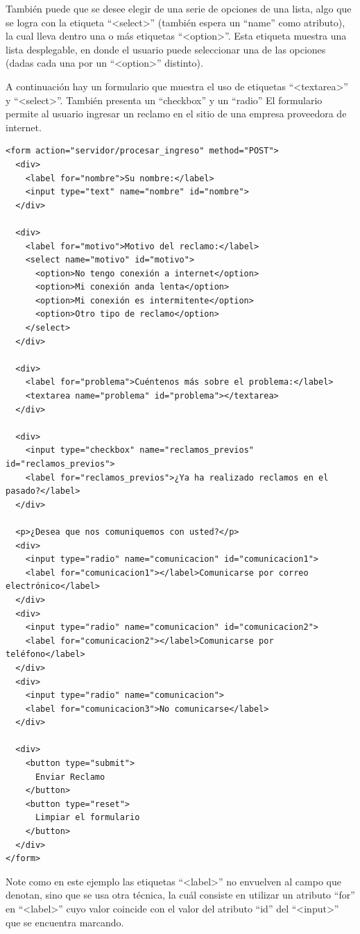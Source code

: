 También puede que se desee elegir de una serie de opciones de una lista, algo
que se logra con la etiqueta ``<select>'' (también espera un ``name'' como
atributo), la cual lleva dentro una o más etiquetas ``<option>''. Esta etiqueta
muestra una lista desplegable, en donde el usuario puede seleccionar una de las
opciones (dadas cada una por un ``<option>'' distinto).

A continuación hay un formulario que muestra el uso de etiquetas ``<textarea>'' y
``<select>''. También presenta un ``checkbox'' y un ``radio'' El formulario permite al usuario ingresar un reclamo en el sitio
de una empresa proveedora de internet.

\begin{lstlisting}[language=XHTML]
<form action="servidor/procesar_ingreso" method="POST">
  <div>
    <label for="nombre">Su nombre:</label>
    <input type="text" name="nombre" id="nombre">
  </div>

  <div>
    <label for="motivo">Motivo del reclamo:</label>
    <select name="motivo" id="motivo">
      <option>No tengo conexión a internet</option>
      <option>Mi conexión anda lenta</option>
      <option>Mi conexión es intermitente</option>
      <option>Otro tipo de reclamo</option>
    </select>
  </div>

  <div>
    <label for="problema">Cuéntenos más sobre el problema:</label>
    <textarea name="problema" id="problema"></textarea>
  </div>

  <div>
    <input type="checkbox" name="reclamos_previos" id="reclamos_previos">
    <label for="reclamos_previos">¿Ya ha realizado reclamos en el pasado?</label>
  </div>

  <p>¿Desea que nos comuniquemos con usted?</p>
  <div>
    <input type="radio" name="comunicacion" id="comunicacion1">
    <label for="comunicacion1"></label>Comunicarse por correo electrónico</label>
  </div>  
  <div>
    <input type="radio" name="comunicacion" id="comunicacion2">
    <label for="comunicacion2"></label>Comunicarse por teléfono</label>
  </div>
  <div>
    <input type="radio" name="comunicacion">
    <label for="comunicacion3">No comunicarse</label>
  </div>
  
  <div>
    <button type="submit">
      Enviar Reclamo
    </button>
    <button type="reset">
      Limpiar el formulario
    </button>
  </div>
</form>
\end{lstlisting}

Note como en este ejemplo las etiquetas ``<label>'' no envuelven al campo
que denotan, sino que se usa otra técnica, la cuál consiste en utilizar
un atributo ``for'' en ``<label>'' cuyo valor coincide con el valor del
atributo ``id'' del ``<input>'' que se encuentra marcando.

